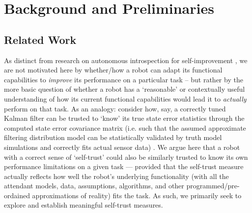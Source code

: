 \section{Background and Preliminaries} \label{sec:background}

\subsection{Related Work}
As distinct from research on autonomous introspection for self-improvement \cite{Paul2011-vr, Triebel2013-ow,Triebel2016-kj}, 
we are not motivated here by whether/how a robot can adapt its functional capabilities to \emph{improve} its performance on a particular task -- but rather by the more basic question of whether a robot has a `reasonable' or contextually useful understanding of how its current functional capabilities would lead it to \emph{actually} perform on that task. As an analogy: consider how, say, a correctly tuned Kalman filter can be trusted to `know' its true state error statistics through the computed state error covariance matrix (i.e. such that the assumed approximate filtering distribution model can be statistically validated by truth model simulations and correctly fits actual sensor data) \cite{Bar-Shalom2001-tg}. We argue here that a robot with a correct sense of `self-trust' could also be similarly trusted to know its own performance limitations on a given task --- provided that the self-trust measure actually reflects how well the robot's underlying functionality (with all the attendant models, data, assumptions, algorithms, and other programmed/pre-ordained approximations of reality) fits the task. As such, we primarily seek to explore and establish meaningful self-trust measures. 

